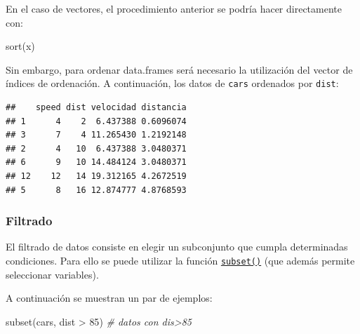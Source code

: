 \documentclass[
]{book}
\newenvironment{Shaded}{\begin{snugshade}}{\end{snugshade}}
\newcommand{\CommentTok}[1]{\textcolor[rgb]{0.56,0.35,0.01}{\textit{#1}}}
\newcommand{\DecValTok}[1]{\textcolor[rgb]{0.00,0.00,0.81}{#1}}
\newcommand{\FunctionTok}[1]{\textcolor[rgb]{0.00,0.00,0.00}{#1}}
\newcommand{\NormalTok}[1]{#1}
\newcommand{\OtherTok}[1]{\textcolor[rgb]{0.56,0.35,0.01}{#1}}
\newcommand{\SpecialCharTok}[1]{\textcolor[rgb]{0.00,0.00,0.00}{#1}}
\theoremstyle{break}
\theoremstyle{nonumberplain}
\begin{document}
En el caso de vectores, el procedimiento anterior se podría
hacer directamente con:

\begin{Shaded}
\begin{Highlighting}[]
\FunctionTok{sort}\NormalTok{(x)}
\end{Highlighting}
\end{Shaded}

Sin embargo, para ordenar data.frames será necesario la utilización del
vector de índices de ordenación. A continuación, los datos de \texttt{cars}
ordenados por \texttt{dist}:

\begin{Shaded}
\end{Shaded}

\begin{verbatim}
##    speed dist velocidad distancia
## 1      4    2  6.437388 0.6096074
## 3      7    4 11.265430 1.2192148
## 2      4   10  6.437388 3.0480371
## 6      9   10 14.484124 3.0480371
## 12    12   14 19.312165 4.2672519
## 5      8   16 12.874777 4.8768593
\end{verbatim}

\hypertarget{filtrado}{%
\subsubsection{Filtrado}\label{filtrado}}

El filtrado de datos consiste en elegir un subconjunto que cumpla determinadas condiciones.
Para ello se puede utilizar la función \href{https://www.rdocumentation.org/packages/base/versions/3.6.1/topics/subset}{\texttt{subset()}} (que además permite seleccionar variables).

A continuación se muestran un par de ejemplos:

\begin{Shaded}
\begin{Highlighting}[]
\FunctionTok{subset}\NormalTok{(cars, dist }\SpecialCharTok{\textgreater{}} \DecValTok{85}\NormalTok{) }\CommentTok{\# datos con dis\textgreater{}85}
\end{Highlighting}
\end{Shaded}
\end{document}
